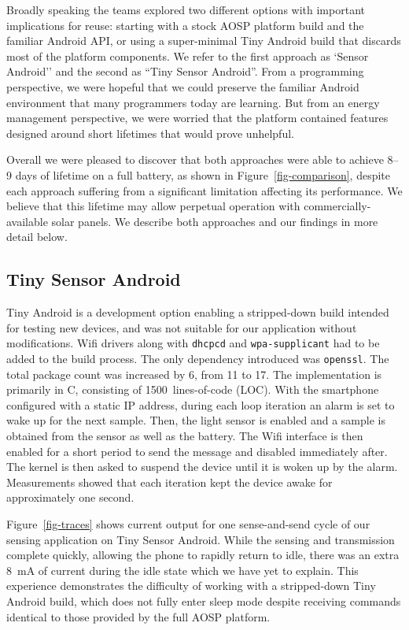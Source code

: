 Broadly speaking the teams explored two different options with important
implications for reuse: starting with a stock AOSP platform build and the
familiar Android API, or using a super-minimal Tiny Android build that
discards most of the platform components. We refer to the first approach as
`Sensor Android'' and the second as ``Tiny Sensor Android''. From a
programming perspective, we were hopeful that we could preserve the familiar
Android environment that many programmers today are learning. But from an
energy management perspective, we were worried that the platform contained
features designed around short lifetimes that would prove unhelpful.

Overall we were pleased to discover that both approaches were able to achieve
8--9 days of lifetime on a full battery, as shown in
Figure~\ref{fig-comparison}, despite each approach suffering from a
significant limitation affecting its performance. We believe that this
lifetime may allow perpetual operation with commercially-available solar
panels. We describe both approaches and our findings in more detail below.

\subsection{Tiny Sensor Android}
\label{subsec-tiny}

Tiny Android is a development option enabling a stripped-down build intended
for testing new devices, and was not suitable for our application without
modifications. Wifi drivers along with \texttt{dhcpcd} and
\texttt{wpa-supplicant} had to be added to the build process. The only
dependency introduced was \texttt{openssl}. The total package count was
increased by 6, from 11 to 17. The implementation is primarily in C,
consisting of 1500~lines-of-code (LOC). With the smartphone configured with a
static IP address, during each loop iteration an alarm is set to wake up for
the next sample. Then, the light sensor is enabled and a sample is obtained
from the sensor as well as the battery. The Wifi interface is then enabled
for a short period to send the message and disabled immediately after. The
kernel is then asked to suspend the device until it is woken up by the alarm.
Measurements showed that each iteration kept the device awake for
approximately one second.

Figure~\ref{fig-traces} shows current output for one sense-and-send cycle of
our sensing application on Tiny Sensor Android. While the sensing and
transmission complete quickly, allowing the phone to rapidly return to idle,
there was an extra 8~mA of current during the idle state which we have yet to
explain. This experience demonstrates the difficulty of working with a
stripped-down Tiny Android build, which does not fully enter sleep mode
despite receiving commands identical to those provided by the full AOSP
platform.


